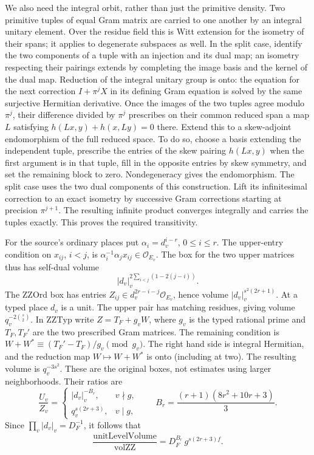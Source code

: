 We also need the integral orbit, rather than just the primitive
density. Two primitive tuples of equal Gram matrix are carried to
one another by an integral unitary element. Over the residue field
this is Witt extension for the isometry of their spans; it applies
to degenerate subspaces as well. In the split case, identify the two
components of a tuple with an injection and its dual map; an
isometry respecting their pairings extends by completing the image
basis and the kernel of the dual map. Reduction of the integral
unitary group is onto: the equation for the next correction
\(I+\pi^j X\) in its defining Gram equation is solved by the same
surjective Hermitian derivative. Once the images of the two tuples
agree modulo \(\pi^j\), their difference divided by \(\pi^j\)
prescribes on their common reduced span a map \(L\) satisfying
\(h(Lx,y)+h(x,Ly)=0\) there. Extend this to a skew-adjoint
endomorphism of the full reduced space. To do so, choose a basis
extending the independent tuple, prescribe the entries of the
skew pairing \(h(Lx,y)\) when the first argument is in that tuple,
fill in the opposite entries by skew symmetry, and set the
remaining block to zero. Nondegeneracy gives the endomorphism.
The split case uses the two dual components of this construction.
Lift its infinitesimal correction to an exact isometry by successive
Gram corrections starting at precision \(\pi^{j+1}\). The resulting
infinite product converges integrally and carries the tuples
exactly. This proves the required transitivity.

For the source's ordinary places put \(\alpha_i=d_v^{i-r}\),
\(0\le i\le r\). The upper-entry condition on \(x_{ij}\), \(i<j\),
is \(\alpha_i^{-1}\alpha_j x_{ij}\in\mathcal O_{E_v}\).
The box for the two upper matrices thus has self-dual volume
\[
       |d_v|_v^{2\sum_{i<j}(1-2(j-i))}.
\]
The \(\mathrm{ZZOrd}\) box has entries
\(Z_{ij}\in d_v^{2r-i-j}\mathcal O_{E_v}\), hence volume
\(|d_v|_v^{s^2(2r+1)}\). At a typed place \(d_v\) is a unit.
The upper pair has matching residues, giving volume
\(q_v^{-2\binom{s}{2}}\). In \(\mathrm{ZZTyp}\) write
\(Z=T_F+g_v W\), where \(g_v\) is the typed rational prime
and \(T_F,T_F'\) are the two prescribed Gram matrices.
The remaining condition is
\(W+W^*\equiv (T_F'-T_F)/g_v\pmod {g_v}\).
The right hand side is integral Hermitian, and the reduction map
\(W\mapsto W+W^*\) is onto (including at two). The resulting volume
is \(q_v^{-3s^2}\). These are the original boxes, not estimates
using larger neighborhoods. Their ratios are
\[
 \frac{U_v}{Z_v}=
 \begin{cases}
 |d_v|_v^{-B_r},& v\nmid g,\\
 q_v^{s(2r+3)},&v\mid g,
 \end{cases}
 \qquad B_r=\frac{(r+1)(8r^2+10r+3)}3 .
\]
Since \(\prod_v|d_v|_v=D_F^{-1}\), it follows that
\[
    \frac{\mathrm{unitLevelVolume}}{\mathrm{volZZ}}
             =D_F^{B_r}\,g^{s(2r+3)f}.                  \tag{AN2}
\]

